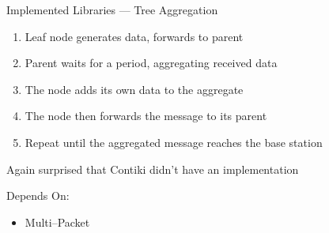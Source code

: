 \documentclass[usenames,dvipsnames]{beamer}
\begin{document}
\begin{frame}{Implemented Libraries --- Tree Aggregation}
	\begin{enumerate}
		\item Leaf node generates data, forwards to parent
		\item Parent waits for a period, aggregating received data
		\item The node adds its own data to the aggregate
		\item The node then forwards the message to its parent
		\item Repeat until the aggregated message reaches the base station
	\end{enumerate}
\vspace{1em}
Again surprised that Contiki didn't have an implementation\newline

Depends On:
	\begin{itemize}
		\item Multi--Packet
	\end{itemize}
\end{frame}
\end{document}
